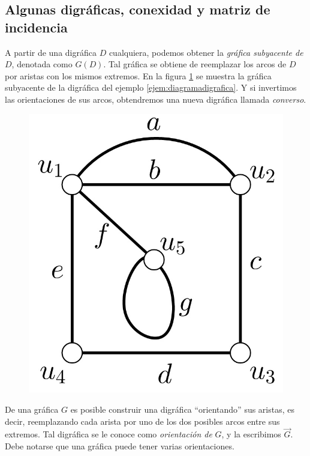  
        \subsection{Algunas digráficas, conexidad y matriz de incidencia}
 A partir de una digráfica $D$ cualquiera, podemos obtener la \textit{gráfica subyacente de} $D$,  denotada como $G(D)$. Tal gráfica se obtiene de reemplazar los arcos de $D$ por aristas con los mismos extremos. En la figura \ref{fig:subyacente} se muestra la gráfica subyacente de la digráfica del ejemplo \ref{ejem:diagramadigrafica}. Y si invertimos las orientaciones de sus arcos, obtendremos una nueva digráfica llamada  \textit{converso}.
 \begin{figure}[H]
 \centering
    \includegraphics[scale=0.25]{img/imgchapter1/graficasubyacente.jpg}
    \caption{}
    \label{fig:subyacente}
 \end{figure} 
De una gráfica $G$ es posible construir una digráfica ``orientando''  sus aristas, es decir, reemplazando cada arista por uno de los dos posibles arcos entre sus extremos. Tal digráfica se le conoce como \textit{orientación de} $G$, y la escribimos $\overrightarrow{G}$. Debe notarse que una gráfica puede tener varias orientaciones.


